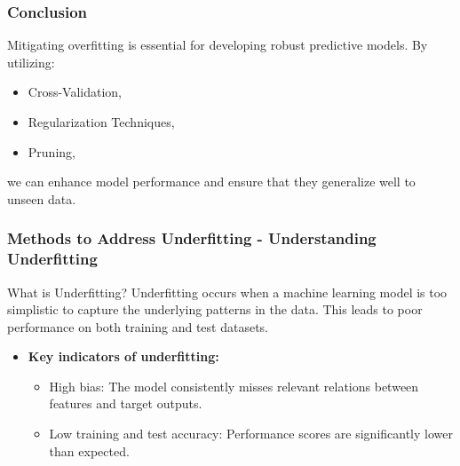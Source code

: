 \documentclass[aspectratio=169]{beamer}
\begin{document}
\begin{frame}[fragile]
    \frametitle{Conclusion}
    Mitigating overfitting is essential for developing robust predictive models. By utilizing:
    \begin{itemize}
        \item Cross-Validation,
        \item Regularization Techniques, 
        \item Pruning,
    \end{itemize}
    we can enhance model performance and ensure that they generalize well to unseen data.
\end{frame}

\begin{frame}[fragile]
    \frametitle{Methods to Address Underfitting - Understanding Underfitting}
    \begin{block}{What is Underfitting?}
        Underfitting occurs when a machine learning model is too simplistic to capture the underlying 
        patterns in the data. This leads to poor performance on both training and test datasets.
    \end{block}

    \begin{itemize}
        \item \textbf{Key indicators of underfitting:}
        \begin{itemize}
            \item High bias: The model consistently misses relevant relations between features and target outputs.
            \item Low training and test accuracy: Performance scores are significantly lower than expected.
        \end{itemize}
    \end{itemize}
\end{frame}
\end{document}
